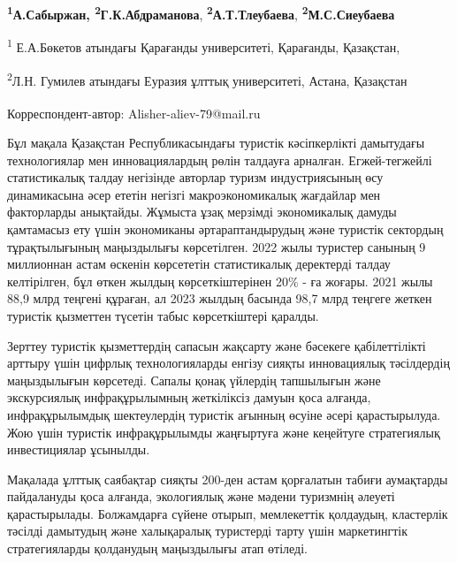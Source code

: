 

\begin{articleheader}


{\bfseries \textsuperscript{1}А.Сабыржан\textsuperscript{\envelope },
\textsuperscript{2}Г.К.Абдраманова},
{\bfseries \textsuperscript{2}А.Т.Тлеубаева},
{\bfseries \textsuperscript{2}М.С.Сиеубаева}
\end{articleheader}
\begin{affiliation}

\textsuperscript{1} Е.А.Бөкетов атындағы Қарағанды университеті,
Қарағанды, Қазақстан,

\textsuperscript{2}Л.Н. Гумилев атындағы Еуразия ұлттық университеті,
Астана, Қазақстан

\raggedright{\bfseries \textsuperscript{\envelope }}Корреспондент-автор:
Alisher-aliev-79@mail.ru
\end{affiliation}

Бұл мақала Қазақстан Республикасындағы туристік кәсіпкерлікті дамытудағы
технологиялар мен инновациялардың рөлін талдауға арналған.
Егжей-тегжейлі статистикалық талдау негізінде авторлар туризм
индустриясының өсу динамикасына әсер ететін негізгі макроэкономикалық
жағдайлар мен факторларды анықтайды. Жұмыста ұзақ мерзімді экономикалық
дамуды қамтамасыз ету үшін экономиканы әртараптандырудың және туристік
сектордың тұрақтылығының маңыздылығы көрсетілген. 2022 жылы туристер
санының 9 миллионнан астам өскенін көрсететін статистикалық деректерді
талдау келтірілген, бұл өткен жылдың көрсеткіштерінен 20\% - ға жоғары.
2021 жылы 88,9 млрд теңгені құраған, ал 2023 жылдың басында 98,7 млрд
теңгеге жеткен туристік қызметтен түсетін табыс көрсеткіштері қаралды.

Зерттеу туристік қызметтердің сапасын жақсарту және бәсекеге
қабілеттілікті арттыру үшін цифрлық технологияларды енгізу сияқты
инновациялық тәсілдердің маңыздылығын көрсетеді. Сапалы қонақ үйлердің
тапшылығын және экскурсиялық инфрақұрылымның жеткіліксіз дамуын қоса
алғанда, инфрақұрылымдық шектеулердің туристік ағынның өсуіне әсері
қарастырылуда. Жою үшін туристік инфрақұрылымды жаңғыртуға және
кеңейтуге стратегиялық инвестициялар ұсынылды.

Мақалада ұлттық саябақтар сияқты 200-ден астам қорғалатын табиғи
аумақтарды пайдалануды қоса алғанда, экологиялық және мәдени туризмнің
әлеуеті қарастырылады. Болжамдарға сүйене отырып, мемлекеттік қолдаудың,
кластерлік тәсілді дамытудың және халықаралық туристерді тарту үшін
маркетингтік стратегияларды қолданудың маңыздылығы атап өтіледі.

